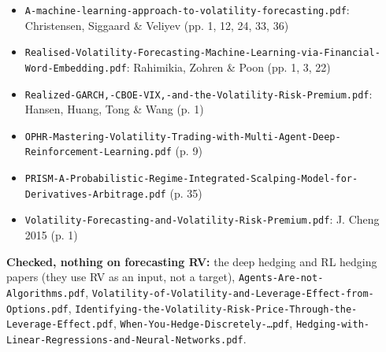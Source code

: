 \documentclass{article}
\begin{document}
\begin{itemize}

\item \texttt{A-\allowbreak{}machine-\allowbreak{}learning-\allowbreak{}approach-\allowbreak{}to-\allowbreak{}volatility-\allowbreak{}forecasting.\allowbreak{}pdf}: Christensen, Siggaard \& Veliyev (pp. 1, 12, 24, 33, 36)

\item \texttt{Realised-\allowbreak{}Volatility-\allowbreak{}Forecasting-\allowbreak{}Machine-\allowbreak{}Learning-\allowbreak{}via-\allowbreak{}Financial-\allowbreak{}Word-\allowbreak{}Embedding.\allowbreak{}pdf}: Rahimikia, Zohren \& Poon (pp. 1, 3, 22)

\item \texttt{Realized-\allowbreak{}GARCH,\allowbreak{}-\allowbreak{}CBOE-\allowbreak{}VIX,\allowbreak{}-\allowbreak{}and-\allowbreak{}the-\allowbreak{}Volatility-\allowbreak{}Risk-\allowbreak{}Premium.\allowbreak{}pdf}: Hansen, Huang, Tong \& Wang (p. 1)

\item \texttt{OPHR-\allowbreak{}Mastering-\allowbreak{}Volatility-\allowbreak{}Trading-\allowbreak{}with-\allowbreak{}Multi-\allowbreak{}Agent-\allowbreak{}Deep-\allowbreak{}Reinforcement-\allowbreak{}Learning.\allowbreak{}pdf} (p. 9)

\item \texttt{PRISM-\allowbreak{}A-\allowbreak{}Probabilistic-\allowbreak{}Regime-\allowbreak{}Integrated-\allowbreak{}Scalping-\allowbreak{}Model-\allowbreak{}for-\allowbreak{}Derivatives-\allowbreak{}Arbitrage.\allowbreak{}pdf} (p. 35)

\item \texttt{Volatility-\allowbreak{}Forecasting-\allowbreak{}and-\allowbreak{}Volatility-\allowbreak{}Risk-\allowbreak{}Premium.\allowbreak{}pdf}: J. Cheng 2015 (p. 1)

\end{itemize}

\textbf{Checked, nothing on forecasting RV:} the deep hedging and RL hedging papers (they use RV as an input, not a target), \texttt{Agents-\allowbreak{}Are-\allowbreak{}not-\allowbreak{}Algorithms.\allowbreak{}pdf}, \texttt{Volatility-\allowbreak{}of-\allowbreak{}Volatility-\allowbreak{}and-\allowbreak{}Leverage-\allowbreak{}Effect-\allowbreak{}from-\allowbreak{}Options.\allowbreak{}pdf}, \texttt{Identifying-\allowbreak{}the-\allowbreak{}Volatility-\allowbreak{}Risk-\allowbreak{}Price-\allowbreak{}Through-\allowbreak{}the-\allowbreak{}Leverage-\allowbreak{}Effect.\allowbreak{}pdf}, \texttt{When-\allowbreak{}You-\allowbreak{}Hedge-\allowbreak{}Discretely-\allowbreak{}\ldots{}pdf}, \texttt{Hedging-\allowbreak{}with-\allowbreak{}Linear-\allowbreak{}Regressions-\allowbreak{}and-\allowbreak{}Neural-\allowbreak{}Networks.\allowbreak{}pdf}.
\end{document}
